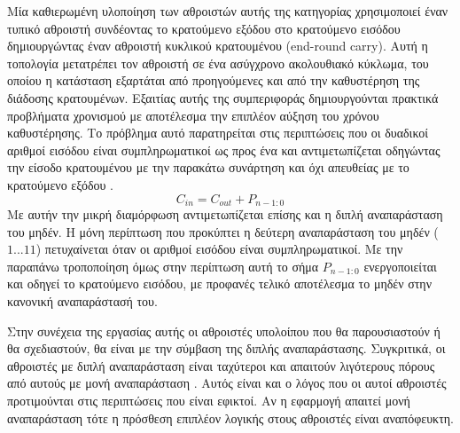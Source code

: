 Μία καθιερωμένη υλοποίηση των αθροιστών αυτής της κατηγορίας χρησιμοποιεί έναν τυπικό αθροιστή
συνδέοντας το κρατούμενο εξόδου στο κρατούμενο εισόδου δημιουργώντας έναν αθροιστή κυκλικού
κρατουμένου (end-round carry). Αυτή η τοπολογία μετατρέπει τον αθροιστή σε ένα ασύγχρονο 
ακολουθιακό κύκλωμα, του οποίου η κατάσταση εξαρτάται από προηγούμενες και από την 
καθυστέρηση της διάδοσης κρατουμένων. Εξαιτίας αυτής της συμπεριφοράς δημιουργούνται
πρακτικά προβλήματα χρονισμού με αποτέλεσμα την επιπλέον αύξηση του χρόνου καθυστέρησης.
Το πρόβλημα αυτό παρατηρείται στις περιπτώσεις που οι δυαδικοί αριθμοί εισόδου 
είναι συμπληρωματικοί ως προς ένα και αντιμετωπίζεται οδηγώντας την είσοδο 
κρατουμένου με την παρακάτω συνάρτηση και όχι απευθείας με το κρατούμενο εξόδου \cite{1674817}.
\begin{equation}
    C_{in} = C_{out} + P_{n-1:0}
\end{equation}
Με αυτήν την μικρή διαμόρφωση αντιμετωπίζεται επίσης και η διπλή αναπαράσταση του μηδέν.
Η μόνη περίπτωση που προκύπτει η δεύτερη αναπαράσταση του μηδέν ($1...11$) πετυχαίνεται
όταν οι αριθμοί εισόδου είναι συμπληρωματικοί. Με την παραπάνω τροποποίηση όμως στην περίπτωση αυτή το σήμα $P_{n-1:0}$ ενεργοποιείται και οδηγεί το κρατούμενο εισόδου, 
με προφανές τελικό αποτέλεσμα το μηδέν στην κανονική αναπαράστασή του.

Στην συνέχεια της εργασίας αυτής οι αθροιστές υπολοίπου που θα παρουσιαστούν ή θα 
σχεδιαστούν, θα είναι με την σύμβαση της διπλής αναπαράστασης. Συγκριτικά, οι αθροιστές
με διπλή αναπαράσταση είναι ταχύτεροι και απαιτούν λιγότερους πόρους από αυτούς
με μονή αναπαράσταση \cite{298378}. Αυτός είναι και ο λόγος που οι αυτοί αθροιστές  
προτιμούνται στις περιπτώσεις που είναι εφικτοί. Αν η εφαρμογή απαιτεί μονή αναπαράσταση 
τότε η πρόσθεση επιπλέον λογικής στους αθροιστές είναι αναπόφευκτη.

















